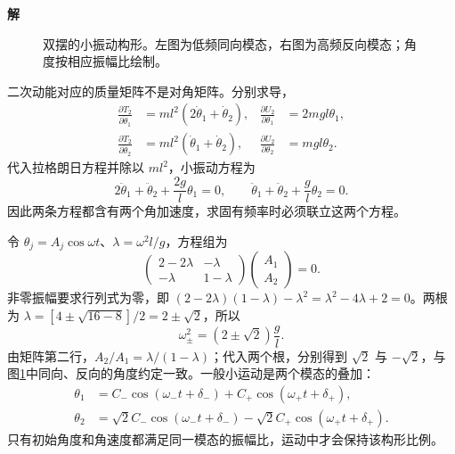 \documentclass[11pt,openany,fontset=fandol]{ctexbook}
\theoremstyle{definition}\newtheorem{example}{例}[chapter]\newtheorem{exercise}{习题}[chapter]
\newcommand{\SolutionStart}{\par\medskip\ifdim\pagetotal>0pt\ifdim\dimexpr\pagegoal-\pagetotal\relax<3\baselineskip\newpage\fi\fi\noindent\textbf{解}\quad\ignorespaces}
\newenvironment{solution}{\SolutionStart}{\par\medskip}
\begin{document}
\begin{solution}
\begin{figure}[H]
\begin{tikzpicture}
\end{tikzpicture}
\caption{双摆的小振动构形。左图为低频同向模态，右图为高频反向模态；角度按相应振幅比绘制。}\label{mp5:fig:l5-h2-s}
\end{figure}

二次动能对应的质量矩阵不是对角矩阵。分别求导，
\[
\begin{aligned}
\frac{\partial T_2}{\partial\dot\theta_1}&=ml^2(2\dot\theta_1+\dot\theta_2),&
\frac{\partial U_2}{\partial\theta_1}&=2mgl\theta_1,\\
\frac{\partial T_2}{\partial\dot\theta_2}&=ml^2(\dot\theta_1+\dot\theta_2),&
\frac{\partial U_2}{\partial\theta_2}&=mgl\theta_2.
\end{aligned}
\]
代入拉格朗日方程并除以 $ml^2$，小振动方程为
\[
2\ddot\theta_1+\ddot\theta_2+\frac{2g}{l}\theta_1=0,
\qquad
\ddot\theta_1+\ddot\theta_2+\frac gl\theta_2=0.
\]
因此两条方程都含有两个角加速度，求固有频率时必须联立这两个方程。

令 $\theta_j=A_j\cos\omega t$、$\lambda=\omega^2l/g$，方程组为
\[
\begin{pmatrix}2-2\lambda&-\lambda\\-\lambda&1-\lambda\end{pmatrix}
\begin{pmatrix}A_1\\A_2\end{pmatrix}=0.
\]
非零振幅要求行列式为零，即 $(2-2\lambda)(1-\lambda)-\lambda^2=\lambda^2-4\lambda+2=0$。两根为 $\lambda=[4\pm\sqrt{16-8}]/2=2\pm\sqrt2$，所以
\[
\boxed{\omega_\pm^2=(2\pm\sqrt2)\frac gl.}
\]
由矩阵第二行，$A_2/A_1=\lambda/(1-\lambda)$；代入两个根，分别得到 $\sqrt2$ 与 $-\sqrt2$，与图\ref{mp5:fig:l5-h2-s}中同向、反向的角度约定一致。一般小运动是两个模态的叠加：
\[
\begin{aligned}
\theta_1&=C_-\cos(\omega_-t+\delta_-)+C_+\cos(\omega_+t+\delta_+),\\
\theta_2&=\sqrt2C_-\cos(\omega_-t+\delta_-)-\sqrt2C_+\cos(\omega_+t+\delta_+).
\end{aligned}
\]
只有初始角度和角速度都满足同一模态的振幅比，运动中才会保持该构形比例。

\end{solution}
\end{document}
